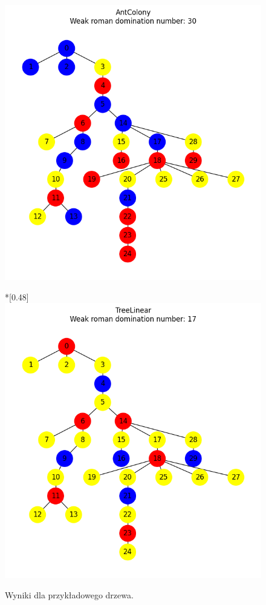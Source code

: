 \begin{figure}[htbp]
\begin{subcaptionbox}
            {\includegraphics[width=0.75\linewidth]{assets/plots/AntColony/RandomTree_n30_i2_results.png}}
        \end{subcaptionbox}
        \hfill
        \begin{subcaptionbox}*{}[0.48\linewidth]
            {\includegraphics[width=0.75\linewidth]{assets/plots/TreeLinear/RandomTree_n30_i2_results.png}}
        \end{subcaptionbox}
    
        \caption{Wyniki dla przykładowego drzewa.}
        \label{fig:tree}
    \end{figure}


